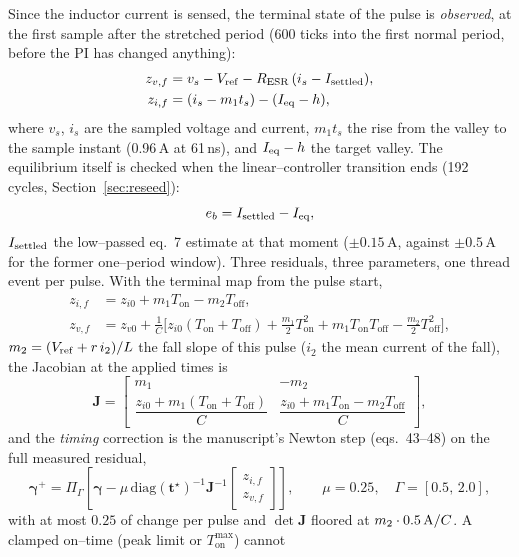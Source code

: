 \documentclass[11pt]{article}
\newcommand{\Ton}{T_{\mathrm{on}}}
\newcommand{\Toff}{T_{\mathrm{off}}}
\begin{document}
Since the inductor current is sensed, the terminal state of the pulse is
\emph{observed}, at the first sample after the stretched period (600 ticks into
the first normal period, before the PI has changed anything):
\begin{align}
z_{v,f}&=v_s-V_{\rm ref}-R_{\rm ESR}\,(i_s-I_{\rm settled}),\\
z_{i,f}&=(i_s-m_1t_s)-(I_{\rm eq}-h),
\end{align}
where $v_s$, $i_s$ are the sampled voltage and current, $m_1t_s$ the rise from
the valley to the sample instant (0.96\,A at 61\,ns), and $I_{\rm eq}-h$ the target
valley. The equilibrium itself is checked when the linear--controller transition
ends (192 cycles, Section~\ref{sec:reseed}):
\begin{equation}
e_b=I_{\rm settled}-I_{\rm eq},
\end{equation}
$I_{\rm settled}$ the low--passed eq.~7 estimate at that moment ($\pm0.15$\,A,
against $\pm0.5$\,A for the former one--period window). Three residuals, three
parameters, one thread event per pulse. With the terminal map from the pulse
start,
\begin{align}
z_{i,f}&=z_{i0}+m_1\Ton-m_2\Toff,\\
z_{v,f}&=z_{v0}+\tfrac1C\big[z_{i0}(\Ton+\Toff)+\tfrac{m_1}{2}\Ton^2+m_1\Ton\Toff-\tfrac{m_2}{2}\Toff^2\big],
\end{align}
$m_2=(V_{\rm ref}+r\,i_2)/L$ the fall slope of this pulse ($i_2$ the mean current
of the fall), the Jacobian at the applied times is
\begin{equation}
\mathbf J=\begin{bmatrix} m_1 & -m_2\\[2pt]
\dfrac{z_{i0}+m_1(\Ton+\Toff)}{C} & \dfrac{z_{i0}+m_1\Ton-m_2\Toff}{C}\end{bmatrix},
\end{equation}
and the \emph{timing} correction is the manuscript's Newton step (eqs.~43--48)
on the full measured residual,
\begin{equation}
\boldsymbol\gamma^{+}=\Pi_\Gamma\!\left[\boldsymbol\gamma-\mu\,\mathrm{diag}(\mathbf t^\star)^{-1}\mathbf J^{-1}\begin{bmatrix}z_{i,f}\\ z_{v,f}\end{bmatrix}\right],
\qquad \mu=0.25,\quad \Gamma=[0.5,\,2.0],
\end{equation}
with at most $0.25$ of change per pulse and $\det\mathbf J$ floored at
$m_2\cdot0.5\,{\rm A}/C$. A clamped on--time (peak limit or $\Ton^{\max}$) cannot
\end{document}
